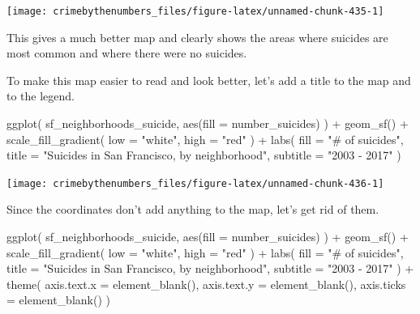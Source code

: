 \documentclass[
  a4paper,
]{krantz}
\makeatletter
\newenvironment{Shaded}{\begin{snugshade}}{\end{snugshade}}
\newcommand{\AttributeTok}[1]{\textcolor[rgb]{0.61,0.61,0.61}{#1}}
\newcommand{\FunctionTok}[1]{\textcolor[rgb]{0,0,0}{#1}}
\newcommand{\NormalTok}[1]{#1}
\newcommand{\SpecialCharTok}[1]{\textcolor[rgb]{0,0,0}{#1}}
\newcommand{\StringTok}[1]{\textcolor[rgb]{0.5,0.5,0.5}{#1}}
\newenvironment{kframe}{%
\medskip{}
\setlength{\fboxsep}{.8em}
 \def\at@end@of@kframe{}%
 \ifinner\ifhmode%
  \def\at@end@of@kframe{\end{minipage}}%
  \begin{minipage}{\columnwidth}%
 \fi\fi%
 \def\FrameCommand##1{\hskip\@totalleftmargin \hskip-\fboxsep
 \colorbox{shadecolor}{##1}\hskip-\fboxsep
     \hskip-\linewidth \hskip-\@totalleftmargin \hskip\columnwidth}%
 \MakeFramed {\advance\hsize-\width
   \@totalleftmargin\z@ \linewidth\hsize
   \@setminipage}}%
 {\par\unskip\endMakeFramed%
 \at@end@of@kframe}
\renewenvironment{Shaded}{\begin{kframe}}{\end{kframe}}
\makeatother
\begin{document}
\begin{center}\texttt{[image: crimebythenumbers\_files/figure-latex/unnamed-chunk-435-1]} \end{center}

This gives a much better map and clearly shows the areas
where suicides are most common and where there were no
suicides.

To make this map easier to read and look better, let's add a
title to the map and to the legend.

\begin{Shaded}
\begin{Highlighting}[]
\FunctionTok{ggplot}\NormalTok{(}
\NormalTok{  sf\_neighborhoods\_suicide,}
  \FunctionTok{aes}\NormalTok{(}\AttributeTok{fill =}\NormalTok{ number\_suicides)}
\NormalTok{) }\SpecialCharTok{+}
  \FunctionTok{geom\_sf}\NormalTok{() }\SpecialCharTok{+}
  \FunctionTok{scale\_fill\_gradient}\NormalTok{(}
    \AttributeTok{low =} \StringTok{"white"}\NormalTok{,}
    \AttributeTok{high =} \StringTok{"red"}
\NormalTok{  ) }\SpecialCharTok{+}
  \FunctionTok{labs}\NormalTok{(}
    \AttributeTok{fill =} \StringTok{"\# of suicides"}\NormalTok{,}
    \AttributeTok{title =} \StringTok{"Suicides in San Francisco, by neighborhood"}\NormalTok{,}
    \AttributeTok{subtitle =} \StringTok{"2003 {-} 2017"}
\NormalTok{  )}
\end{Highlighting}
\end{Shaded}

\begin{center}\texttt{[image: crimebythenumbers\_files/figure-latex/unnamed-chunk-436-1]} \end{center}

Since the coordinates don't add anything to the map, let's
get rid of them.

\begin{Shaded}
\begin{Highlighting}[]
\FunctionTok{ggplot}\NormalTok{(}
\NormalTok{  sf\_neighborhoods\_suicide,}
  \FunctionTok{aes}\NormalTok{(}\AttributeTok{fill =}\NormalTok{ number\_suicides)}
\NormalTok{) }\SpecialCharTok{+}
  \FunctionTok{geom\_sf}\NormalTok{() }\SpecialCharTok{+}
  \FunctionTok{scale\_fill\_gradient}\NormalTok{(}
    \AttributeTok{low =} \StringTok{"white"}\NormalTok{,}
    \AttributeTok{high =} \StringTok{"red"}
\NormalTok{  ) }\SpecialCharTok{+}
  \FunctionTok{labs}\NormalTok{(}
    \AttributeTok{fill =} \StringTok{"\# of suicides"}\NormalTok{,}
    \AttributeTok{title =} \StringTok{"Suicides in San Francisco, by neighborhood"}\NormalTok{,}
    \AttributeTok{subtitle =} \StringTok{"2003 {-} 2017"}
\NormalTok{  ) }\SpecialCharTok{+}
  \FunctionTok{theme}\NormalTok{(}
    \AttributeTok{axis.text.x =} \FunctionTok{element\_blank}\NormalTok{(),}
    \AttributeTok{axis.text.y =} \FunctionTok{element\_blank}\NormalTok{(),}
    \AttributeTok{axis.ticks =} \FunctionTok{element\_blank}\NormalTok{()}
\NormalTok{  )}
\end{Highlighting}
\end{Shaded}
\end{document}
